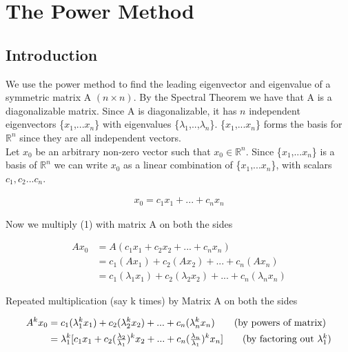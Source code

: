 \documentclass[11pt]{article}
\begin{document}
\newpage
\section{The Power Method}
\subsection{Introduction}
We use the power method to find the leading eigenvector and eigenvalue of a symmetric matrix A  $(n \times n)$. By the Spectral Theorem we have that A is a diagonalizable matrix. Since A is diagonalizable, it has $n$ independent eigenvectors \{$x_{1}$,...$x_{n}$\} with eigenvalues \{$\lambda_{1}$,..,$\lambda_{n}$\}. \{$x_{1}$,...$x_{n}$\} forms the basis for $\mathbb{R}^{n}$ since they are all independent vectors. \\

Let $x_{0}$ be an arbitrary non-zero vector such that $x_{0} \in \mathbb{R}^{n}$. Since \{$x_{1}$,...$x_{n}$\} is a basis of $\mathbb{R}^{n}$ we can write $x_{0}$  as a linear combination of \{$x_{1}$,...$x_{n}$\}, with scalars $c_{1}, c_{2}...c_{n}$. 

\begin{align*}
     x_{0} = c_{1}x_{1} + ... + c_{n}x_{n} \tag{1}
\end{align*}

Now we multiply (1) with matrix A on both the sides

\begin{align*}
    Ax_{0} & = A(c_{1}x_{1} + c_{2}x_{2} + ... + c_{n}x_{n}) \tag{by substitution}\\
    & = c_{1}(Ax_{1}) + c_{2}(Ax_{2}) + ... + c_{n}(Ax_{n}) \tag{by linearity}\\
    & = c_{1}(\lambda_{1}x_{1}) + c_{2}(\lambda_{2}x_{2}) + ... + c_{n}(\lambda_{n}x_{n}) \tag{by eigenvalue defn}
\end{align*}

Repeated multiplication (say k times) by Matrix A on both the sides 

\begin{align*}
     A^{k}x_{0} &= c_{1}(\lambda_{1}^{k}x_{1}) + c_{2}(\lambda_{2}^{k}x_{2}) +... + c_{n}(\lambda_{n}^{k}x_{n}) \tag{by powers of matrix}\\
     &= \lambda_{1}^{k}[c_{1}x_{1} + c_{2}(\tfrac{\lambda_{2}}{\lambda_{1}})^{k}x_{2} +... +  c_{n}(\tfrac{\lambda_{n}}{\lambda_{1}})^{k}x_{n}] \tag{by factoring out $\lambda_{1}^{k}$}\\
\end{align*}
\end{document}

